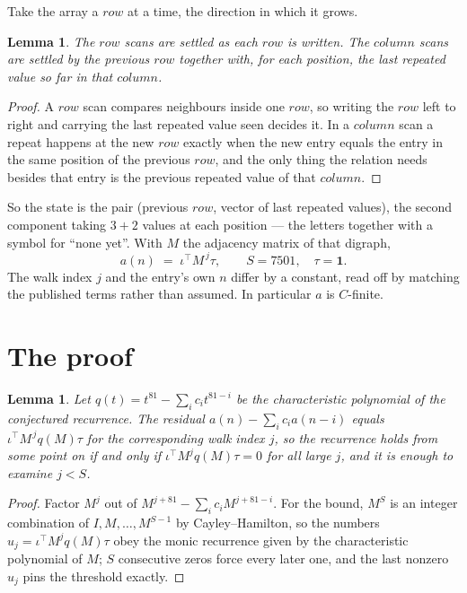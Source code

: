 \documentclass[11pt,a4paper]{article}
\theoremstyle{plain}
\newtheorem{lemma}[theorem]{Lemma}
\theoremstyle{definition}
\begin{document}
Take the array a $row$ at a time, the direction in which it grows.

\begin{lemma}\label{lem:state}
The $row$ scans are settled as each $row$ is written. The $column$ scans are
settled by the previous $row$ together with, for each position, the last repeated value
so far in that $column$.
\end{lemma}

\begin{proof}
A $row$ scan compares neighbours inside one $row$, so writing the
$row$ left to right and carrying the last repeated value seen decides it. In a
$column$ scan a repeat happens at the new $row$ exactly when the new entry equals the
entry in the same position of the previous $row$, and the only thing the relation needs
besides that entry is the previous repeated value of that $column$.
\end{proof}

So the state is the pair (previous $row$, vector of last repeated values), the second
component taking $3+2$ values at each position --- the letters together with a symbol for
``none yet''. With $M$ the adjacency matrix of that digraph,
\[
a(n)\;=\;\iota^{\!\top}M^{\,j}\tau ,\qquad S=7501,\quad\tau=\mathbf{1} .
\]
The walk index $j$ and the entry's own $n$ differ by a constant, read off by matching the
published terms rather than assumed. In particular $a$ is $C$-finite.

\section{The proof}

\begin{lemma}\label{lem:crit}
Let $q(t)=t^{81}-\sum_i c_it^{81-i}$ be the characteristic polynomial of the
conjectured recurrence. The residual $a(n)-\sum_ic_ia(n-i)$ equals
$\iota^{\!\top}M^{\,j}q(M)\tau$ for the corresponding walk index $j$, so the recurrence
holds from some point on if and only if $\iota^{\!\top}M^{j}q(M)\tau=0$ for all large $j$,
and it is enough to examine $j<S$.
\end{lemma}

\begin{proof}
Factor $M^{j}$ out of $M^{j+81}-\sum_ic_iM^{j+81-i}$. For the bound, $M^{S}$
is an integer combination of $I,M,\dots,M^{S-1}$ by Cayley--Hamilton, so the numbers
$u_j=\iota^{\!\top}M^{j}q(M)\tau$ obey the monic recurrence given by the characteristic
polynomial of $M$; $S$ consecutive zeros force every later one, and the last nonzero $u_j$
pins the threshold exactly.
\end{proof}
\end{document}
